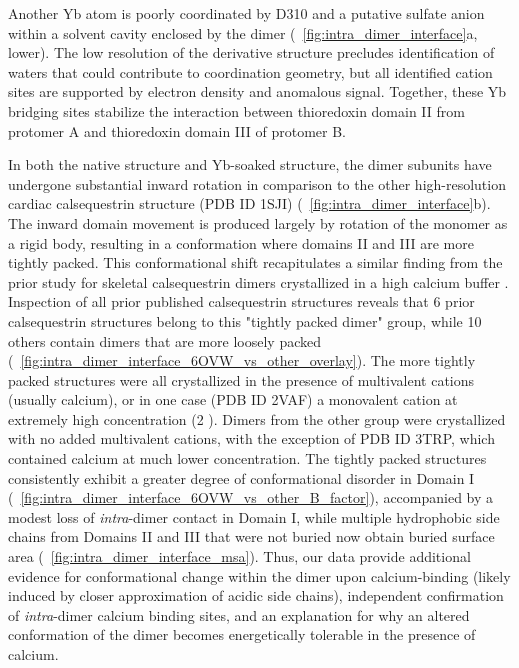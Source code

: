 Another Yb atom is poorly coordinated by D310 and a putative sulfate anion within a solvent cavity enclosed by the dimer (\maintextfigure~\ref{fig:intra_dimer_interface}a, lower). The low resolution of the derivative structure precludes identification of waters that could contribute to coordination geometry, but all identified cation sites are supported by electron density and anomalous signal. Together, these Yb bridging sites stabilize the interaction between thioredoxin domain II from protomer A and thioredoxin domain III of protomer B. 

In both the native structure and Yb-soaked structure, the dimer subunits have undergone substantial inward rotation in comparison to the other high-resolution cardiac calsequestrin structure (PDB ID 1SJI) (\maintextfigure~\ref{fig:intra_dimer_interface}b). The inward domain movement is produced largely by rotation of the monomer as a rigid body, resulting in a conformation where domains II and III are more tightly packed. This conformational shift recapitulates a similar finding from the prior study for skeletal calsequestrin dimers crystallized in a high calcium buffer \supercite{Sanchez2012-qi}. Inspection of all prior published calsequestrin structures reveals that 6 prior calsequestrin structures belong to this "tightly packed dimer" group, while 10 others contain dimers that are more loosely packed (\extendeddatafigure~\ref{fig:intra_dimer_interface_6OVW_vs_other_overlay}). The more tightly packed structures were all crystallized in the presence of multivalent cations (usually calcium), or in one case (PDB ID 2VAF) a monovalent cation at extremely high concentration (\SI{2}{\Molar} ). Dimers from the other group were crystallized with no added multivalent cations, with the exception of PDB ID 3TRP, which contained calcium at much lower concentration. The tightly packed structures consistently exhibit a greater degree of conformational disorder in Domain I (\extendeddatafigure~\ref{fig:intra_dimer_interface_6OVW_vs_other_B_factor}), accompanied by a modest loss of \textit{intra}-dimer contact in Domain I, while multiple hydrophobic side chains from Domains II and III that were not buried now obtain buried surface area (\supplementaryfigure~\ref{fig:intra_dimer_interface_msa}). Thus, our data provide additional evidence for conformational change within the dimer upon calcium-binding (likely induced by closer approximation of acidic side chains), independent confirmation of \textit{intra}-dimer calcium binding sites, and an explanation for why an altered conformation of the dimer becomes energetically tolerable in the presence of calcium. 

